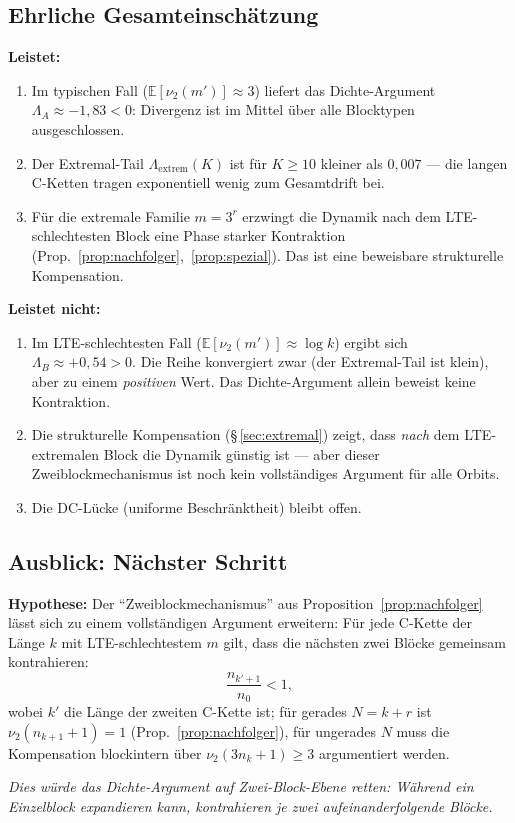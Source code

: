 \documentclass[12pt,a4paper]{article}
\newcommand{\vii}{\nu_2}
\begin{document}
\subsection{Ehrliche Gesamteinschätzung}

\begin{tcolorbox}[warnung, title={Was das Dichte-Argument leistet und was nicht}]
\textbf{Leistet:}
\begin{enumerate}[label=(\arabic*), nosep]
  \item Im typischen Fall ($\mathbb{E}[\vii(m')] \approx 3$) liefert das
    Dichte-Argument $\Lambda_A \approx -1{,}83 < 0$: Divergenz ist
    im Mittel über alle Blocktypen ausgeschlossen.
  \item Der Extremal-Tail $\Lambda_{\mathrm{extrem}}(K)$ ist für $K \geq 10$
    kleiner als $0{,}007$ --- die langen C-Ketten tragen exponentiell
    wenig zum Gesamtdrift bei.
  \item Für die extremale Familie $m = 3^r$ erzwingt die Dynamik nach dem
    LTE-schlechtesten Block eine Phase starker Kontraktion
    (Prop.~\ref{prop:nachfolger},~\ref{prop:spezial}). Das ist eine
    beweisbare strukturelle Kompensation.
\end{enumerate}

\textbf{Leistet nicht:}
\begin{enumerate}[label=(\arabic*), nosep]
  \item Im LTE-schlechtesten Fall ($\mathbb{E}[\vii(m')] \approx \log k$)
    ergibt sich $\Lambda_B \approx +0{,}54 > 0$. Die Reihe konvergiert
    zwar (der Extremal-Tail ist klein), aber zu einem \emph{positiven}
    Wert. Das Dichte-Argument allein beweist keine Kontraktion.
  \item Die strukturelle Kompensation (§\,\ref{sec:extremal}) zeigt, dass
    \emph{nach} dem LTE-extremalen Block die Dynamik günstig ist --- aber
    dieser Zweiblockmechanismus ist noch kein vollständiges Argument für
    alle Orbits.
  \item Die DC-Lücke (uniforme Beschränktheit) bleibt offen.
\end{enumerate}
\end{tcolorbox}

\subsection{Ausblick: Nächster Schritt}

\begin{tcolorbox}[konj]
\textbf{Hypothese:} Der ``Zweiblockmechanismus'' aus
Proposition~\ref{prop:nachfolger} lässt sich zu einem vollständigen
Argument erweitern: Für jede C-Kette der Länge $k$ mit LTE-schlechtestem
$m$ gilt, dass die nächsten zwei Blöcke gemeinsam kontrahieren:
\[
  \frac{n_{k'+1}}{n_0} < 1,
\]
wobei $k'$ die Länge der zweiten C-Kette ist; für gerades
$N=k+r$ ist $\vii(n_{k+1}+1)=1$ (Prop.~\ref{prop:nachfolger}), für
ungerades $N$ muss die Kompensation blockintern über $\vii(3n_k+1)\geq 3$
argumentiert werden.

\textit{Dies würde das Dichte-Argument auf Zwei-Block-Ebene retten:
Während ein Einzelblock expandieren kann, kontrahieren je zwei
aufeinanderfolgende Blöcke.}
\end{tcolorbox}
\end{document}
